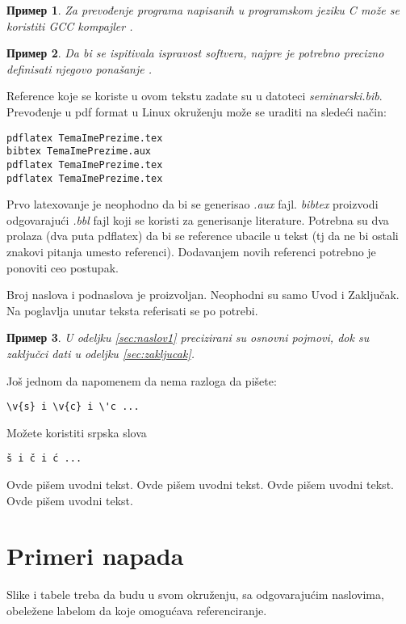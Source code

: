 \documentclass[a4paper]{article}
\newtheorem{primer}{Пример}[section] %
\begin{document}
{\begin{primer}
Za prevođenje programa napisanih u programskom jeziku C može se koristiti GCC kompajler \cite{gcc}.
\end{primer}

\begin{primer}
 Da bi se ispitivala ispravost softvera, najpre je potrebno precizno definisati njegovo ponašanje \cite{laski2009software}. 
\end{primer}

Reference koje se koriste u ovom tekstu zadate su u datoteci {\em seminarski.bib}. Prevođenje u pdf format u Linux okruženju može se uraditi na sledeći način:
\begin{verbatim}
pdflatex TemaImePrezime.tex 
bibtex TemaImePrezime.aux 
pdflatex TemaImePrezime.tex 
pdflatex TemaImePrezime.tex 
\end{verbatim}
Prvo latexovanje je neophodno da bi se generisao {\em .aux} fajl. {\em bibtex} proizvodi odgovarajući {\em .bbl} fajl koji se koristi za generisanje literature. 
Potrebna su dva prolaza (dva puta pdflatex) da bi se reference ubacile u tekst (tj da ne bi ostali znakovi pitanja umesto referenci). Dodavanjem novih referenci potrebno je ponoviti ceo postupak.  


Broj naslova i podnaslova je proizvoljan. Neophodni su samo Uvod i Zaključak. Na poglavlja unutar teksta referisati se po potrebi. 
\begin{primer}
U odeljku \ref{sec:naslov1} precizirani su osnovni pojmovi, dok su zaključci dati u odeljku \ref{sec:zakljucak}.
\end{primer}

Još jednom da napomenem da nema razloga da pišete:
\begin{verbatim}
\v{s} i \v{c} i \'c ...
\end{verbatim}
Možete koristiti srpska slova
\begin{verbatim}
š i č i ć ... 
\end{verbatim}


Ovde pišem uvodni tekst.
Ovde pišem uvodni tekst. 
Ovde pišem uvodni tekst. 
Ovde pišem uvodni tekst. 


\section{Primeri napada}
\label{primeri_napada}

Slike i tabele treba da budu u svom okruženju, sa odgovarajućim naslovima, obeležene labelom da koje omogućava referenciranje. 

}
\end{document}
